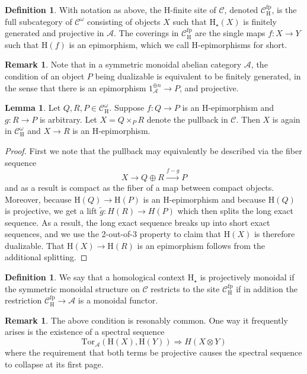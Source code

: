 \documentclass[10pt]{amsart}
\theoremstyle{definition}
\numberwithin{figure}{section}
\numberwithin{equation}{section}
\newtheorem{lemma}[figure]{Lemma}
\newtheorem{definition}[figure]{Definition}
\newtheorem{remark}[figure]{Remark}
\newcommand{\cA}{\mathcal{A}}
\newcommand{\cC}{\mathcal{C}}
\newcommand{\one}{\mathrm{1}}
\theoremstyle{cited}
\newcommand{\fp}{\mathrm{fp}}
\renewcommand{\H}{\mathrm{H}}
\newcommand{\Tor}{\mathrm{Tor}}
\begin{document}
\begin{definition}
  With notation as above, the $\H$-finite site of $\cC$, denoted $\cC^{\fp}_{\H}$, is the full subcategory of $\cC^\omega$ consisting of objects $X$ such that $\H_{\star}(X)$ is finitely generated and projective in $\cA$. The coverings in $\cC^\fp_{\H}$ are the single maps $f:X\to Y$ such that $\H(f)$ is an epimorphism, which we call $\H$-epimorphisms for short.
\end{definition}

\begin{remark}
  Note that in a symmetric monoidal abelian category $\cA$, the condition of an object $P$ being dualizable is equivalent to be finitely generated, in the sense that there is an epimorphism $\one_{\cA}^{\oplus n}\to P$, and projective.
\end{remark}

\begin{lemma}
  \label{lem:sitepullbacks}
  Let $Q,R,P\in \cC^\omega_\H$. Suppose $f:Q\to P$ is an $\H$-epimorphism and $g:R\to P$ is arbitrary. Let $X=Q\times_P R$ denote the pullback in $\cC$. Then $X$ is again in $\cC^\omega_\H$ and $X\to R$ is an $\H$-epimorphism.
\end{lemma}

\begin{proof}
  First we note that the pullback may equivalently be described via the fiber sequence
  \[
  X\to Q\oplus R \xrightarrow{f-g} P
  \]
  and as a result is compact as the fiber of a map between compact objects. Moreover, because $\H(Q)\to \H(P)$ is an $\H$-epimorphism and because $\H(Q)$ is projective, we get a lift $\tilde g:H(R)\to H(P)$ which then splits the long exact sequence. As a result, the long exact sequence breaks up into short exact sequences, and we use the 2-out-of-3 property to claim that $\H(X)$ is therefore dualizable. That $\H(X)\to \H(R)$ is an epimorphism follows from the additional splitting.
\end{proof}

\begin{definition}
  We say that a homological context $\H_\star$ is projectively monoidal if 
  the symmetric monoidal structure on $\cC$ restricts to the site $\cC^\fp_\H$ if in addition the restriction $\cC^\fp_\H\to \cA$ is a monoidal functor.
\end{definition}

\begin{remark}
  The above condition is resonably common. One way it frequently arises is the existence of a spectral sequence 
  \[
  \Tor_{\cA}(\H(X),\H(Y))\Rightarrow H(X\otimes Y)
  \]
  where the requirement that both terms be projective causes the spectral sequence to collapse at its first page.
\end{remark}
\end{document}
